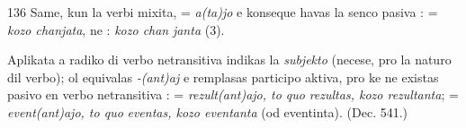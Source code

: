 \begin{VUpage}[140]{136}
Same, kun la verbi mixita,  = \textit{a(ta)jo} e konseque havas\nl
la senco pasiva :  = \textit{kozo chanjata}, ne : \textit{kozo chan}\cc
\textit{janta} (3).

Aplikata a radiko di verbo netransitiva  indikas la\nl
\textit{subjekto} (necese, pro la naturo dil verbo); ol equivalas\nl
\textit{-(ant)aj} e remplasas participo aktiva, pro ke ne existas pasivo\nl
en verbo netransitiva :  = \textit{rezult(ant)ajo, to quo}\nl
\textit{rezultas, kozo rezultanta};  = \textit{event(ant)ajo, to quo}\nl
\textit{eventas, kozo eventanta} (od eventinta). \nl
{}\nl
{} (Dec. 541.)
\end{VUpage}

